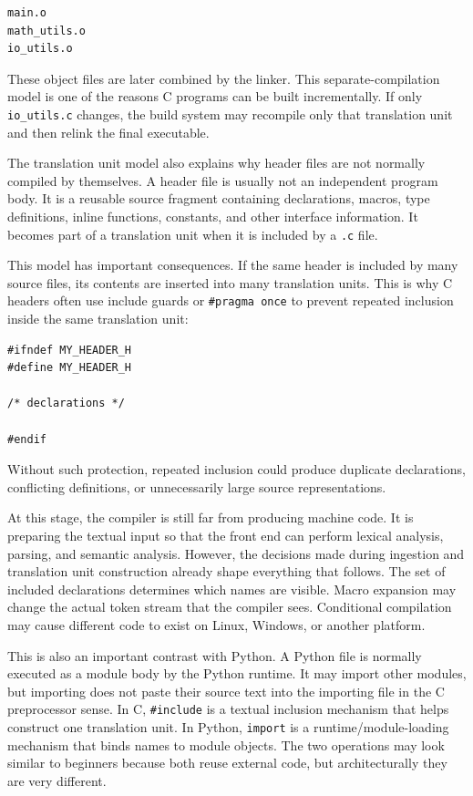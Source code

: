 \begin{verbatim}
main.o
math_utils.o
io_utils.o
\end{verbatim}

These object files are later combined by the linker. This separate-compilation model is one of the reasons C programs can be built incrementally. If only \texttt{io_utils.c} changes, the build system may recompile only that translation unit and then relink the final executable.

The translation unit model also explains why header files are not normally compiled by themselves. A header file is usually not an independent program body. It is a reusable source fragment containing declarations, macros, type definitions, inline functions, constants, and other interface information. It becomes part of a translation unit when it is included by a \texttt{.c} file.

This model has important consequences. If the same header is included by many source files, its contents are inserted into many translation units. This is why C headers often use include guards or \texttt{\#pragma once} to prevent repeated inclusion inside the same translation unit:

\begin{verbatim}
#ifndef MY_HEADER_H
#define MY_HEADER_H

/* declarations */

#endif
\end{verbatim}

Without such protection, repeated inclusion could produce duplicate declarations, conflicting definitions, or unnecessarily large source representations.

At this stage, the compiler is still far from producing machine code. It is preparing the textual input so that the front end can perform lexical analysis, parsing, and semantic analysis. However, the decisions made during ingestion and translation unit construction already shape everything that follows. The set of included declarations determines which names are visible. Macro expansion may change the actual token stream that the compiler sees. Conditional compilation may cause different code to exist on Linux, Windows, or another platform.

This is also an important contrast with Python. A Python file is normally executed as a module body by the Python runtime. It may import other modules, but importing does not paste their source text into the importing file in the C preprocessor sense. In C, \texttt{\#include} is a textual inclusion mechanism that helps construct one translation unit. In Python, \texttt{import} is a runtime/module-loading mechanism that binds names to module objects. The two operations may look similar to beginners because both reuse external code, but architecturally they are very different.

